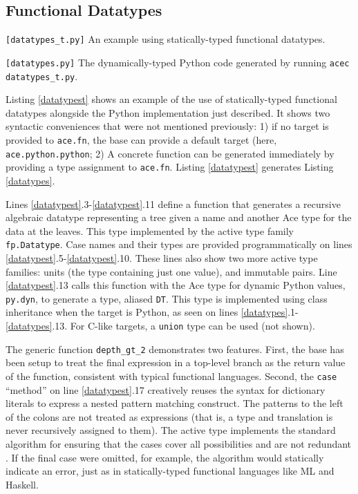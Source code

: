 \documentclass[9pt,preprint]{sigplanconf}
\begin{document}
\subsection{Functional Datatypes}
\begin{codelisting}

\caption{\texttt{[datatypes\_t.py]} An example using statically-typed functional datatypes.}
\label{datatypest}
\end{codelisting}
\begin{codelisting}

\caption{\texttt{[datatypes.py]} The dynamically-typed Python code generated by running \texttt{acec datatypes\_t.py}.}
\label{datatypes}
\end{codelisting}
Listing \ref{datatypest} shows an example of the use of statically-typed functional datatypes alongside the Python implementation just described. It shows two syntactic conveniences that were not mentioned previously: 1) if no target is provided to \verb|ace.fn|, the base can provide a default target (here, \verb|ace.python.python|; 2) A concrete function can be generated immediately by providing a type assignment to \verb|ace.fn|. Listing \ref{datatypest} generates Listing \ref{datatypes}.

Lines \ref{datatypest}.3-\ref{datatypest}.11 define a function that generates a recursive algebraic datatype representing a tree given a name and another Ace type for the data at the leaves. This type implemented by the active type family \verb|fp.Datatype|. Case names and their types are provided programmatically on lines \ref{datatypest}.5-\ref{datatypest}.10. These lines also show two more active type families: units (the type containing just one value), and immutable pairs. Line \ref{datatypest}.13 calls this function with the Ace type for dynamic Python values, \verb|py.dyn|, to generate a type, aliased \verb|DT|. This type is implemented using class inheritance when the target is Python, as seen on lines \ref{datatypes}.1-\ref{datatypes}.13. For C-like targets, a \verb|union| type can be used (not shown).

The generic function \verb|depth_gt_2| demonstrates two features. First, the base has been setup to treat the final expression in a top-level branch as the return value of the function, consistent with typical functional languages. Second, the \verb|case| ``method'' on line \ref{datatypest}.17 creatively reuses the syntax for dictionary literals to express a nested pattern matching construct. The patterns to the left of the colons are not treated as expressions (that is, a type and translation is never recursively assigned to them). The active type implements the standard algorithm for ensuring that the cases cover all possibilities and are not redundant \cite{pfpl}. If the final case were omitted, for example, the algorithm would statically indicate an error, just as in statically-typed functional languages like ML and Haskell.
\end{document}

